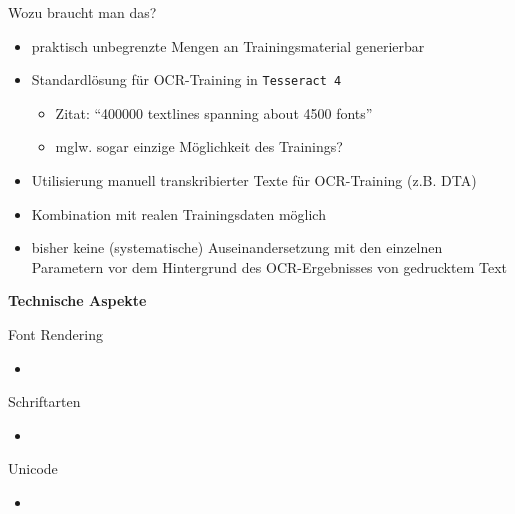 \documentclass{bbawslides}
\begin{document}
\begin{bbawslide}{Wozu braucht man das?}
  \vspace*{7mm}%
  \centerslidestrue%
  \begin{itemize}
    \item praktisch unbegrenzte Mengen an Trainingsmaterial generierbar
    \item Standardlösung für OCR-Training in \texttt{Tesseract 4}
    \begin{itemize}\small
       \item Zitat: \enquote{400000 textlines spanning about 4500 fonts}
       \item mglw. sogar einzige Möglichkeit des Trainings?
    \end{itemize}
    \item Utilisierung manuell transkribierter Texte für OCR-Training (z.B. DTA)
    \item Kombination mit realen Trainingsdaten möglich
    \item bisher keine (systematische) Auseinandersetzung mit den einzelnen Parametern vor dem Hintergrund des OCR-Ergebnisses von gedrucktem Text
  \end{itemize}
\end{bbawslide}

\begin{bbawpart}{\Large\bf Technische Aspekte}
\end{bbawpart}

\begin{bbawslide}{Font Rendering}
  \vspace*{7mm}%
  \centerslidestrue%
  \begin{itemize}
    \item
  \end{itemize}
\end{bbawslide}

\begin{bbawslide}{Schriftarten}
  \vspace*{7mm}%
  \centerslidestrue%
  \begin{itemize}
    \item
  \end{itemize}
\end{bbawslide}

\begin{bbawslide}{Unicode}
  \vspace*{7mm}%
  \centerslidestrue%
  \begin{itemize}
    \item
  \end{itemize}
\end{bbawslide}
\end{document}
